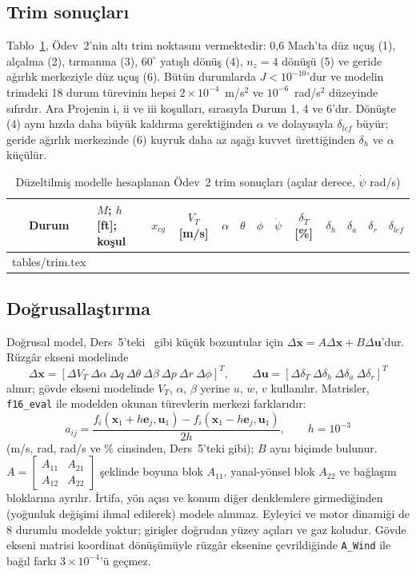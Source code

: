 \documentclass[conf]{new-aiaa}
\makeatletter
\newcommand\tabinput[1]{\@@input #1 }
\makeatother
\begin{document}
\subsection{Trim sonuçları}
Tablo~\ref{tab:trim}, Ödev~2'nin altı trim noktasını vermektedir: 0,6 Mach'ta düz uçuş (1), alçalma (2), tırmanma (3), $60^\circ$ yatışlı dönüş (4), $n_z=4$ dönüşü (5) ve geride ağırlık merkeziyle düz uçuş (6). Bütün durumlarda $J<10^{-10}$'dur ve modelin trimdeki 18 durum türevinin hepsi $2\times10^{-4}$~m/s$^2$ ve $10^{-6}$~rad/s$^2$ düzeyinde sıfırdır. Ara Projenin i, ii ve iii koşulları, sırasıyla Durum 1, 4 ve 6'dır. Dönüşte (4) aynı hızda daha büyük kaldırma gerektiğinden $\alpha$ ve dolayısıyla $\delta_{lef}$ büyür; geride ağırlık merkezinde (6) kuyruk daha az aşağı kuvvet ürettiğinden $\delta_h$ ve $\alpha$ küçülür.

\begin{table}[hbt!]
\caption{\label{tab:trim} Düzeltilmiş modelle hesaplanan Ödev~2 trim sonuçları (açılar derece, $\dot\psi$ rad/s)}
\centering
\small
\setlength\tabcolsep{3.5pt}
\begin{tabular}{clccccccccccc}
\toprule
Durum & $M$; $h$ [ft]; koşul & $x_{cg}$ & $V_T$ [m/s] & $\alpha$ & $\theta$ & $\phi$ & $\dot\psi$ & $\delta_T$ [\%] & $\delta_h$ & $\delta_a$ & $\delta_r$ & $\delta_{lef}$ \\
\midrule
\tabinput{tables/trim.tex}
\bottomrule
\end{tabular}
\end{table}

\subsection{Doğrusallaştırma}
Doğrusal model, Ders~5'teki~\cite{lec5} gibi küçük bozuntular için $\Delta\dot{\mathbf x}=A\Delta\mathbf x+B\Delta\mathbf u$'dur. Rüzgâr ekseni modelinde
\begin{equation}
\Delta\mathbf x=[\Delta V_T\ \Delta\alpha\ \Delta q\ \Delta\theta\ \Delta\beta\ \Delta p\ \Delta r\ \Delta\phi]^T,\qquad
\Delta\mathbf u=[\Delta\delta_T\ \Delta\delta_h\ \Delta\delta_a\ \Delta\delta_r]^T
\end{equation}
alınır; gövde ekseni modelinde $V_T$, $\alpha$, $\beta$ yerine $u$, $w$, $v$ kullanılır. Matrisler, \texttt{f16\_eval} ile modelden okunan türevlerin merkezi farklarıdır:
\begin{equation}
a_{ij}=\frac{f_i(\mathbf x_1+h\mathbf e_j,\mathbf u_1)-f_i(\mathbf x_1-h\mathbf e_j,\mathbf u_1)}{2h},\qquad h=10^{-3}
\end{equation}
(m/s, rad, rad/s ve \% cinsinden, Ders~5'teki gibi); $B$ aynı biçimde bulunur. $A=\begin{bmatrix}A_{11}&A_{21}\\A_{12}&A_{22}\end{bmatrix}$ şeklinde boyuna blok $A_{11}$, yanal-yönsel blok $A_{22}$ ve bağlaşım bloklarına ayrılır. İrtifa, yön açısı ve konum diğer denklemlere girmediğinden (yoğunluk değişimi ihmal edilerek) modele alınmaz. Eyleyici ve motor dinamiği de 8 durumlu modelde yoktur; girişler doğrudan yüzey açıları ve gaz koludur. Gövde ekseni matrisi koordinat dönüşümüyle rüzgâr eksenine çevrildiğinde \texttt{A\_Wind} ile bağıl farkı $3\times10^{-4}$'ü geçmez.
\end{document}
